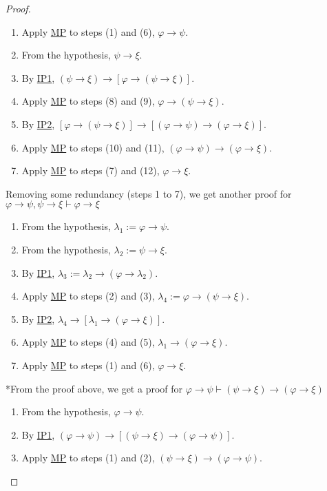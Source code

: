 \documentclass{treatise}
\begin{document}
\begin{proof}
\begin{enumerate}
    \item Apply \hyperref[HPL-R-MP]{MP} to steps (1) and (6), $\varphi \to \psi$.
    \\
    \item From the hypothesis, $\psi \to \xi$.
    \item By \hyperref[HPL-A-IP1]{IP1}, $(\psi \to \xi) \to [\varphi \to (\psi \to \xi)]$.
    \item Apply \hyperref[HPL-R-MP]{MP} to steps (8) and (9), $\varphi \to (\psi \to \xi)$.
    \\
    \item By \hyperref[HPL-A-IP2]{IP2}, $[\varphi \to (\psi \to \xi)] \to [(\varphi \to \psi) \to (\varphi \to \xi)]$.
    \item Apply \hyperref[HPL-R-MP]{MP} to steps (10) and (11), $(\varphi \to \psi) \to (\varphi \to \xi)$.
    \item Apply \hyperref[HPL-R-MP]{MP} to steps (7) and (12), $\varphi \to \xi$.
\end{enumerate}
Removing some redundancy (steps 1 to 7), we get another proof for $\varphi \to \psi, \psi \to \xi \vdash \varphi \to \xi$
\begin{enumerate}
    \item From the hypothesis, $\lambda_1 := \varphi \to \psi$.
    \item From the hypothesis, $\lambda_2 := \psi \to \xi$.
    \item By \hyperref[HPL-A-IP1]{IP1}, $\lambda_3 := \lambda_2 \to (\varphi \to \lambda_2)$.
    \item Apply \hyperref[HPL-R-MP]{MP} to steps (2) and (3), $\lambda_4 := \varphi \to (\psi \to \xi)$.
    \item By \hyperref[HPL-A-IP2]{IP2}, $\lambda_4 \to [\lambda_1 \to (\varphi \to \xi)]$.
    \item Apply \hyperref[HPL-R-MP]{MP} to steps (4) and (5), $\lambda_1 \to (\varphi \to \xi)$.
    \item Apply \hyperref[HPL-R-MP]{MP} to steps (1) and (6), $\varphi \to \xi$.
\end{enumerate}
*From the proof above, we get a proof for $\varphi \to \psi \vdash (\psi \to \xi) \to (\varphi \to \xi)$
\begin{enumerate}
    \item From the hypothesis, $\varphi \to \psi$.
    \item By \hyperref[HPL-A-IP1]{IP1}, $(\varphi \to \psi) \to [(\psi \to \xi) \to (\varphi \to \psi)]$.
    \item Apply \hyperref[HPL-R-MP]{MP} to steps (1) and (2), $(\psi \to \xi) \to (\varphi \to \psi)$.

\end{enumerate}
\end{proof}
\end{document}
